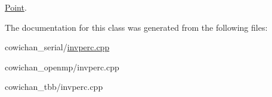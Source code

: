 \hyperlink{class_point}{Point}. 

The documentation for this class was generated from the following files:\begin{CompactItemize}
\item 
cowichan\_\-serial/\hyperlink{cowichan__serial_2invperc_8cpp}{invperc.cpp}\item 
cowichan\_\-openmp/invperc.cpp\item 
cowichan\_\-tbb/invperc.cpp\end{CompactItemize}
